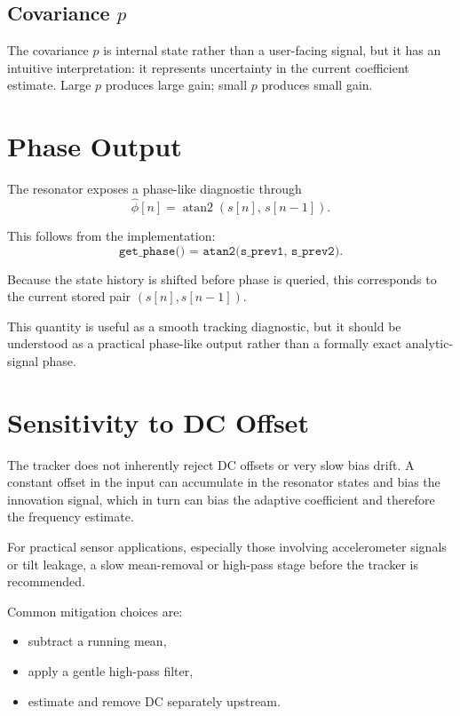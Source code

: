 \documentclass[conference]{IEEEtran}
\begin{document}
\subsection{Covariance $p$}

The covariance $p$ is internal state rather than a user-facing signal, but it
has an intuitive interpretation: it represents uncertainty in the current
coefficient estimate. Large $p$ produces large gain; small $p$ produces small
gain.

\section{Phase Output}\label{sec:phase}

The resonator exposes a phase-like diagnostic through
\begin{equation}
  \hat\phi[n] = \operatorname{atan2}(s[n],\,s[n-1]).
\end{equation}

This follows from the implementation:
\begin{equation}
  \texttt{get\_phase() = atan2(s\_prev1, s\_prev2)}.
\end{equation}

Because the state history is shifted before phase is queried, this
corresponds to the current stored pair $(s[n],s[n-1])$.

This quantity is useful as a smooth tracking diagnostic, but it should be
understood as a practical phase-like output rather than a formally exact
analytic-signal phase.

\section{Sensitivity to DC Offset}\label{sec:dc}

The tracker does not inherently reject DC offsets or very slow bias drift.
A constant offset in the input can accumulate in the resonator states and
bias the innovation signal, which in turn can bias the adaptive coefficient
and therefore the frequency estimate.

For practical sensor applications, especially those involving accelerometer
signals or tilt leakage, a slow mean-removal or high-pass stage before the
tracker is recommended.

Common mitigation choices are:
\begin{itemize}[leftmargin=1.4em]
  \item subtract a running mean,
  \item apply a gentle high-pass filter,
  \item estimate and remove DC separately upstream.
\end{itemize}
\end{document}
